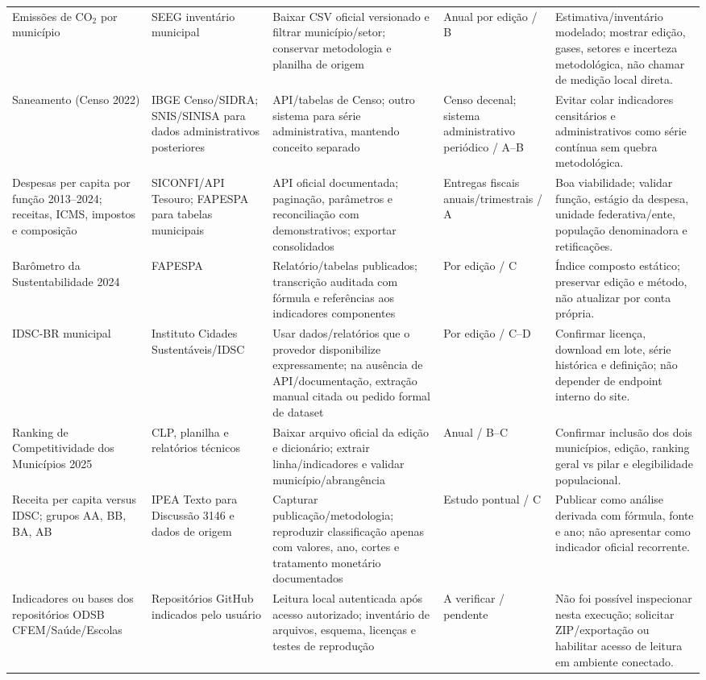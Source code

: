 \documentclass[12pt]{article}
\begin{document}
\begin{longtable}{p{} p{} p{} p{} p{}}
Emissões de CO$_2$ por município & SEEG inventário municipal \cite{seeg} & Baixar CSV oficial versionado e filtrar município/setor; conservar metodologia e planilha de origem & Anual por edição / B & Estimativa/inventário modelado; mostrar edição, gases, setores e incerteza metodológica, não chamar de medição local direta.\\
Saneamento (Censo 2022) & IBGE Censo/SIDRA; SNIS/SINISA para dados administrativos posteriores \cite{ibgeapi} & API/tabelas de Censo; outro sistema para série administrativa, mantendo conceito separado & Censo decenal; sistema administrativo periódico / A--B & Evitar colar indicadores censitários e administrativos como série contínua sem quebra metodológica.\\
Despesas per capita por função 2013--2024; receitas, ICMS, impostos e composição & SICONFI/API Tesouro; FAPESPA para tabelas municipais \cite{siconfi,fapespa} & API oficial documentada; paginação, parâmetros e reconciliação com demonstrativos; exportar consolidados & Entregas fiscais anuais/trimestrais / A & Boa viabilidade; validar função, estágio da despesa, unidade federativa/ente, população denominadora e retificações.\\
Barômetro da Sustentabilidade 2024 & FAPESPA \cite{barometro} & Relatório/tabelas publicados; transcrição auditada com fórmula e referências aos indicadores componentes & Por edição / C & Índice composto estático; preservar edição e método, não atualizar por conta própria.\\
IDSC-BR municipal & Instituto Cidades Sustentáveis/IDSC \cite{idsc} & Usar dados/relatórios que o provedor disponibilize expressamente; na ausência de API/documentação, extração manual citada ou pedido formal de dataset & Por edição / C--D & Confirmar licença, download em lote, série histórica e definição; não depender de endpoint interno do site.\\
Ranking de Competitividade dos Municípios 2025 & CLP, planilha e relatórios técnicos \cite{clp} & Baixar arquivo oficial da edição e dicionário; extrair linha/indicadores e validar município/abrangência & Anual / B--C & Confirmar inclusão dos dois municípios, edição, ranking geral vs pilar e elegibilidade populacional.\\
Receita per capita versus IDSC; grupos AA, BB, BA, AB & IPEA Texto para Discussão 3146 e dados de origem \cite{ipea} & Capturar publicação/metodologia; reproduzir classificação apenas com valores, ano, cortes e tratamento monetário documentados & Estudo pontual / C & Publicar como análise derivada com fórmula, fonte e ano; não apresentar como indicador oficial recorrente.\\
Indicadores ou bases dos repositórios ODSB CFEM/Saúde/Escolas & Repositórios GitHub indicados pelo usuário & Leitura local autenticada após acesso autorizado; inventário de arquivos, esquema, licenças e testes de reprodução & A verificar / pendente & Não foi possível inspecionar nesta execução; solicitar ZIP/exportação ou habilitar acesso de leitura em ambiente conectado.\\
\end{longtable}
\normalsize
\end{document}
